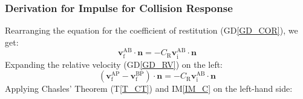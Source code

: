 \documentclass[12pt]{article}
\begin{document}
\subsubsection*{Derivation for Impulse for Collision Response}

Rearranging the equation for the coefficient of restitution (GD\ref{GD_COR}), we get:
$$\mathbf{v}^\mathrm{AB}_\mathrm{f} \cdot \mathbf{n} = -C_\mathrm{R}\mathbf{v}^\mathrm{AB}_\mathrm{i} \cdot \mathbf{n}$$
\noindent Expanding the relative velocity (GD\ref{GD_RV}) on the left:
$$(\mathbf{v}^\mathrm{AP}_\mathrm{f} - \mathbf{v}^\mathrm{BP}_\mathrm{f}) \cdot \mathbf{n} = -C_\mathrm{R}\mathbf{v}^\mathrm{AB}_\mathrm{i} \cdot \mathbf{n}$$
\noindent
Applying Chasles' Theorem (T\ref{T_CT}) and IM\ref{IM_C} on the left-hand side:
\end{document}
